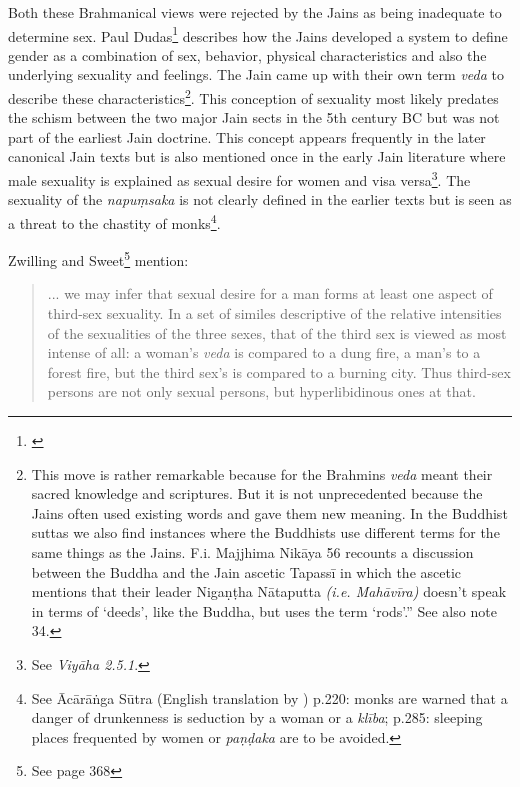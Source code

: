 Both these Brahmanical views were rejected by the Jains as being inadequate to determine sex. Paul Dudas\footnote{\cite{dundas}} describes how the Jains developed a system to define gender as a combination of sex, behavior, physical characteristics and also the underlying sexuality and feelings. The Jain came up with their own term {\em veda} to describe these characteristics\footnote{This move is rather remarkable because for the Brahmins {\em veda} meant their sacred knowledge and scriptures. But it is not unprecedented because the Jains often used existing words and gave them new meaning. In the Buddhist suttas we also find instances where the Buddhists use different terms for the same things as the Jains. F.i. Majjhima Nikāya 56 recounts a discussion between the Buddha and the Jain ascetic Tapassī in which the ascetic mentions that their leader Nigaṇṭha Nātaputta {\em (i.e. Mahāvīra)} doesn’t speak in terms of ‘deeds’, like the Buddha, but uses the term ‘rods’.” See also \cite{zwilling} note 34.}. This conception of sexuality most likely predates the schism between the two major Jain sects in the 5th century BC but was not part of the earliest Jain doctrine. This concept appears frequently in the later canonical Jain texts but is also mentioned once in the early Jain literature where male sexuality is explained as sexual desire for women and visa versa\footnote{See {\em Viyāha 2.5.1}.}. The sexuality of the {\em napuṃsaka} is not clearly defined in the earlier texts but is seen as a threat to the chastity of monks\footnote{See Ācārāṅga Sūtra (English translation by \cite{jacobi}) p.220: monks are warned that a danger of drunkenness is seduction by a woman or a {\em klība}; p.285: sleeping places frequented by women or {\em paṇḍaka} are to be avoided.}.

Zwilling and Sweet\footnote{See \cite{zwilling} page 368} mention:

\begin{quote}
... we may infer that sexual desire for a man forms at least one aspect of third-sex sexuality. In a set of similes descriptive of the relative intensities of the sexualities of the three sexes, that of the third sex is viewed as most intense of all: a woman's {\em veda} is compared to a dung fire, a man's to a forest fire, but the third sex's is compared to a burning city. Thus third-sex persons are not only sexual persons, but hyperlibidinous ones at that.
\end{quote}

